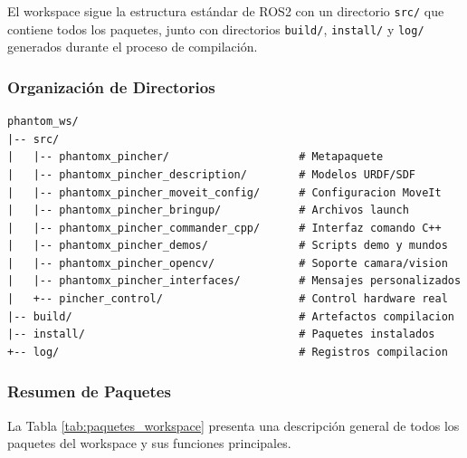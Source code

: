 El workspace sigue la estructura estándar de ROS2 con un directorio \texttt{src/} que contiene todos los paquetes, junto con directorios \texttt{build/}, \texttt{install/} y \texttt{log/} generados durante el proceso de compilación.

\subsubsection{Organización de Directorios}

\begin{verbatim}
phantom_ws/
|-- src/
|   |-- phantomx_pincher/                    # Metapaquete
|   |-- phantomx_pincher_description/        # Modelos URDF/SDF
|   |-- phantomx_pincher_moveit_config/      # Configuracion MoveIt
|   |-- phantomx_pincher_bringup/            # Archivos launch
|   |-- phantomx_pincher_commander_cpp/      # Interfaz comando C++
|   |-- phantomx_pincher_demos/              # Scripts demo y mundos
|   |-- phantomx_pincher_opencv/             # Soporte camara/vision
|   |-- phantomx_pincher_interfaces/         # Mensajes personalizados
|   +-- pincher_control/                     # Control hardware real
|-- build/                                   # Artefactos compilacion
|-- install/                                 # Paquetes instalados
+-- log/                                     # Registros compilacion
\end{verbatim}

\subsubsection{Resumen de Paquetes}

La Tabla \ref{tab:paquetes_workspace} presenta una descripción general de todos los paquetes del workspace y sus funciones principales.

